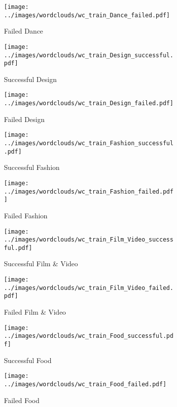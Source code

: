 \documentclass{article}
\begin{document}
{\begin{itemize}
\begin{figure}
\begin{subfigure}[d']{0.2\linewidth}
    \centering\texttt{[image: ../images/wordclouds/wc\_train\_Dance\_failed.pdf]}
    \caption{Failed Dance}
    \label{fig:Dance_f}
   \end{subfigure}
    \begin{subfigure}[e]{0.2\linewidth}
    \centering\texttt{[image: ../images/wordclouds/wc\_train\_Design\_successful.pdf]}
    \caption{Successful Design}
    \label{fig:Design_s}
  \end{subfigure} 
  \begin{subfigure}[e']{0.2\linewidth}
    \centering\texttt{[image: ../images/wordclouds/wc\_train\_Design\_failed.pdf]}
    \caption{Failed Design}
    \label{fig:Design_f}
  \end{subfigure} 
    \begin{subfigure}[f]{0.2\linewidth}
    \centering\texttt{[image: ../images/wordclouds/wc\_train\_Fashion\_successful.pdf]}
    \caption{Successful Fashion}
    \label{fig:Fashion_s}
  \end{subfigure} 
  \begin{subfigure}[f']{0.2\linewidth}
    \centering\texttt{[image: ../images/wordclouds/wc\_train\_Fashion\_failed.pdf]}
    \caption{Failed Fashion}
    \label{fig:Fashion_f}
  \end{subfigure}
    \begin{subfigure}[g]{0.2\linewidth}
    \centering\texttt{[image: ../images/wordclouds/wc\_train\_Film\_Video\_successful.pdf]}
    \caption{Successful Film \& Video}
    \label{fig:Film_Video_s}
  \end{subfigure} 
  \begin{subfigure}[g']{0.2\linewidth}
    \centering\texttt{[image: ../images/wordclouds/wc\_train\_Film\_Video\_failed.pdf]}
    \caption{Failed Film \& Video}
    \label{fig:Film_Video_f}
  \end{subfigure}
    \begin{subfigure}[h]{0.2\linewidth}
    \centering\texttt{[image: ../images/wordclouds/wc\_train\_Food\_successful.pdf]}
    \caption{Successful Food}
    \label{fig:Food_s}
  \end{subfigure} 
  \begin{subfigure}[h']{0.2\linewidth}
    \centering\texttt{[image: ../images/wordclouds/wc\_train\_Food\_failed.pdf]}
    \caption{Failed Food}
    \label{fig:Food_f}
  \end{subfigure}
    \begin{subfigure}[i]{0.2\linewidth}

\end{subfigure}
\end{figure}
\end{itemize}}
\end{document}
